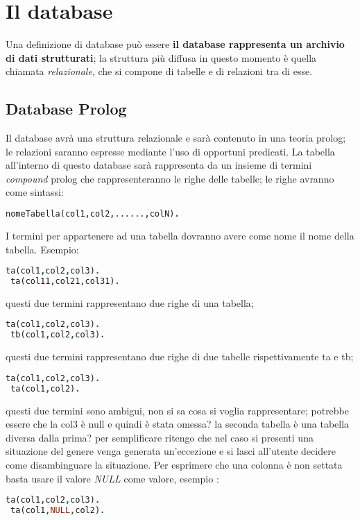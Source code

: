 \section{Il database}

Una definizione di database può essere {\bf il database rappresenta un archivio di dati strutturati}; la struttura più diffusa in questo momento è quella chiamata \emph{relazionale}, che si compone di tabelle e di relazioni tra di esse.

\subsection{Database Prolog}
Il database avrà una struttura relazionale e sarà contenuto in una teoria prolog; le relazioni saranno espresse mediante l'uso di opportuni predicati. La tabella all'interno di questo database sarà rappresenta da un insieme di termini \emph{compound} prolog che rappresenteranno le righe delle tabelle; le righe avranno come sintassi:  
\begin{lstlisting}[language=Prolog]
 nomeTabella(col1,col2,......,colN).
\end{lstlisting}
I termini per appartenere ad una tabella dovranno avere come nome il nome della tabella. Esempio:
\begin{lstlisting}[language=Prolog]
 ta(col1,col2,col3).
 ta(col11,col21,col31).
\end{lstlisting}
questi due termini rappresentano due righe di una tabella;
\begin{lstlisting}[language=Prolog]
 ta(col1,col2,col3).
 tb(col1,col2,col3).
\end{lstlisting}
questi due termini rappresentano due righe di due tabelle rispettivamente ta e tb;
\begin{lstlisting}[language=Prolog]
 ta(col1,col2,col3).
 ta(col1,col2).
\end{lstlisting}
questi due termini sono ambigui, non si sa cosa si voglia rappresentare; potrebbe essere che la col3 è null e quindi è stata omessa? la seconda tabella è una tabella diversa dalla prima? per semplificare ritengo che nel caso si presenti una situazione del genere venga generata un'eccezione e si lasci all'utente decidere come disambinguare la situazione. Per esprimere che una colonna è non settata basta usare il valore \emph{NULL} come valore, esempio : 

\begin{lstlisting}[language=Prolog]
 ta(col1,col2,col3).
 ta(col1,NULL,col2).
\end{lstlisting} 

